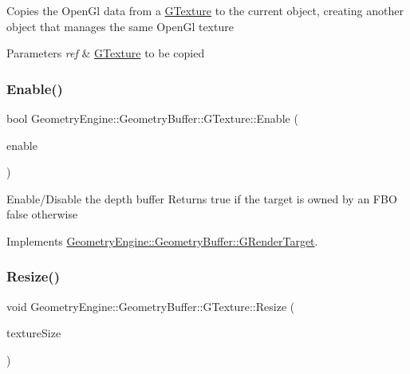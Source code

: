 Copies the Open\+Gl data from a \mbox{\hyperlink{class_geometry_engine_1_1_geometry_buffer_1_1_g_texture}{G\+Texture}} to the current object, creating another object that manages the same Open\+Gl texture 
\begin{DoxyParams}{Parameters}
{\em ref} & \mbox{\hyperlink{class_geometry_engine_1_1_geometry_buffer_1_1_g_texture}{G\+Texture}} to be copied \\
\hline
\end{DoxyParams}
\mbox{\label{class_geometry_engine_1_1_geometry_buffer_1_1_g_texture_a528604f22629785271b3f36ec18ffc78}} 
\subsubsection{\texorpdfstring{Enable()}{Enable()}}
{\footnotesize\ttfamily bool Geometry\+Engine\+::\+Geometry\+Buffer\+::\+G\+Texture\+::\+Enable (\begin{DoxyParamCaption}\item[{bool}]{enable }\end{DoxyParamCaption})\hspace{0.3cm}{\ttfamily [virtual]}}

Enable/\+Disable the depth buffer Returns true if the target is owned by an F\+BO false otherwise 

Implements \mbox{\hyperlink{class_geometry_engine_1_1_geometry_buffer_1_1_g_render_target_a1b8be750dfd13582d0730bf9e4c4e1d2}{Geometry\+Engine\+::\+Geometry\+Buffer\+::\+G\+Render\+Target}}.

\mbox{\label{class_geometry_engine_1_1_geometry_buffer_1_1_g_texture_a17c5c626b214d8d0bfb9988b52376a55}} 
\subsubsection{\texorpdfstring{Resize()}{Resize()}}
{\footnotesize\ttfamily void Geometry\+Engine\+::\+Geometry\+Buffer\+::\+G\+Texture\+::\+Resize (\begin{DoxyParamCaption}\item[{const Q\+Vector2D \&}]{texture\+Size }\end{DoxyParamCaption})\hspace{0.3cm}{\ttfamily [virtual]}}


